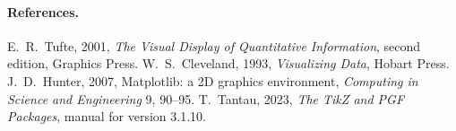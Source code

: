 \paragraph{References.}
\begingroup\sloppy
E.~R.~Tufte, 2001, \emph{The Visual Display of Quantitative Information}, second edition, Graphics Press.
W.~S.~Cleveland, 1993, \emph{Visualizing Data}, Hobart Press.
J.~D.~Hunter, 2007, Matplotlib: a 2D graphics environment, \emph{Computing in Science and Engineering} 9, 90--95.
T.~Tantau, 2023, \emph{The TikZ and PGF Packages}, manual for version 3.1.10.\par\endgroup
\endgroup
